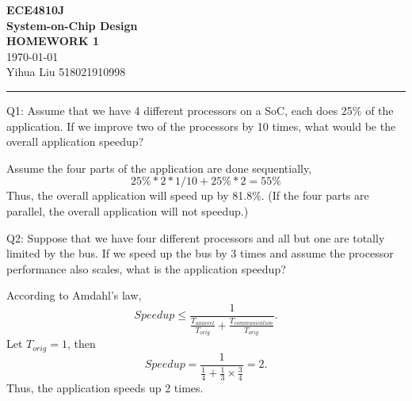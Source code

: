 \documentclass[a4paper]{article}
\begin{document}
\begin{center}
    \huge
    \textbf{ECE4810J\\System-on-Chip Design\\}
    \Large
    \vspace{15pt}
    \uppercase{\textbf{Homework 1}}\\
    \large
    \vspace{5pt}\today\\
    \vspace{5pt}
    Yihua Liu 518021910998
    \vspace{5pt}
    \rule[-5pt]{.97\linewidth}{0.05em}
\end{center}

Q1: Assume that we have 4 different processors on a SoC, each does 25\% of the application. If we improve two of the processors by 10 times, what would be the overall application speedup?

Assume the four parts of the application are done sequentially,
$$25\%*2*1/10+25\%*2=55\%$$
Thus, the overall application will speed up by 81.8\%. (If the four parts are parallel, the overall application will not speedup.)

Q2: Suppose that we have four different processors and all but one are totally limited by the bus. If we speed up the bus by 3 times and assume the processor performance also scales, what is the application speedup?

According to Amdahl's law,
\[Speedup\leq\frac{1}{\frac{T_{unaccel}}{T_{orig}}+\frac{T_{communication}}{T_{orig}}}.\]
Let $T_{orig}=1$, then
\[Speedup=\frac{1}{\frac{1}{4}+\frac{1}{3}\times\frac{3}{4}}=2.\]
Thus, the application speeds up 2 times.
\end{document}
